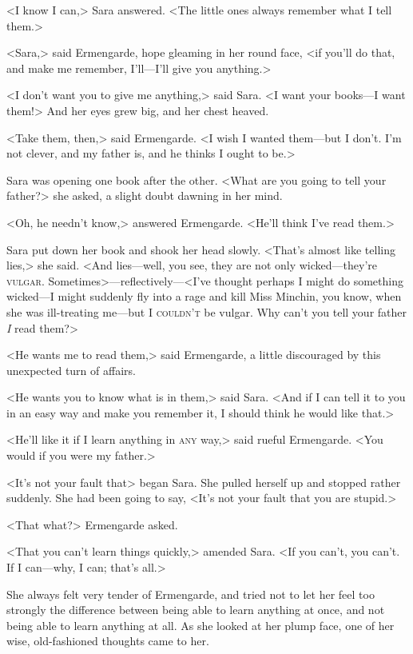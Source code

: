 <I know I can,> Sara answered. <The little ones always remember what I tell them.>

<Sara,> said Ermengarde, hope gleaming in her round face, <if you'll do that, and make me remember, I'll—I'll give you anything.>

<I don't want you to give me anything,> said Sara. <I want your books—I want them!> And her eyes grew big, and her chest heaved.

<Take them, then,> said Ermengarde. <I wish I wanted them—but I don't. I'm not clever, and my father is, and he thinks I ought to be.>

Sara was opening one book after the other. <What are you going to tell your father?> she asked, a slight doubt dawning in her mind.

<Oh, he needn't know,> answered Ermengarde. <He'll think I've read them.>

Sara put down her book and shook her head slowly. <That's almost like telling lies,> she said. <And lies—well, you see, they are not only wicked—they're \textsc{vulgar}. Sometimes>—reflectively—<I've thought perhaps I might do something wicked—I might suddenly fly into a rage and kill Miss Minchin, you know, when she was ill-treating me—but I \textsc{couldn't} be vulgar. Why can't you tell your father \textit{I} read them?>

<He wants me to read them,> said Ermengarde, a little discouraged by this unexpected turn of affairs.

<He wants you to know what is in them,> said Sara. <And if I can tell it to you in an easy way and make you remember it, I should think he would like that.>

<He'll like it if I learn anything in \textsc{any} way,> said rueful Ermengarde. <You would if you were my father.>

<It's not your fault that\longdash> began Sara. She pulled herself up and stopped rather suddenly. She had been going to say, <It's not your fault that you are stupid.>

<That what?> Ermengarde asked.

<That you can't learn things quickly,> amended Sara. <If you can't, you can't. If I can—why, I can; that's all.>

She always felt very tender of Ermengarde, and tried not to let her feel too strongly the difference between being able to learn anything at once, and not being able to learn anything at all. As she looked at her plump face, one of her wise, old-fashioned thoughts came to her.

